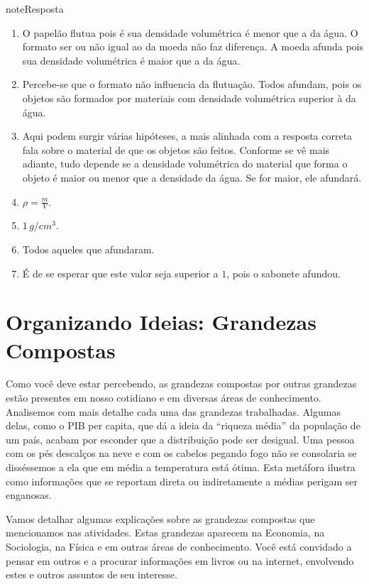 \begin{sphinxadmonition}{note}{Resposta}
\begin{enumerate}
\item {} 
O papelão  flutua pois é sua densidade volumétrica é menor que a da água. O formato ser ou não igual ao da moeda não faz diferença. A moeda afunda pois sua densidade volumétrica é maior que a da água.

\item {} 
Percebe-se que o formato não influencia da flutuação. Todos afundam, pois os objetos são formados por materiais  com densidade volumétrica superior à da água.

\item {} 
Aqui podem surgir várias hipóteses, a mais alinhada com a resposta correta fala sobre o material de que os objetos são feitos. Conforme se vê mais adiante, tudo depende se a densidade volumétrica do material que forma o objeto é maior ou menor que a densidade da água. Se for maior, ele afundará.

\item {} 
\(\rho = \frac{m}{V}\).

\item {} 
\(1 \,g/cm^3\).

\item {} 
Todos aqueles que afundaram.

\item {} 
É de se esperar que este valor seja superior a \(1\), pois o sabonete afundou.

\end{enumerate}
\end{sphinxadmonition}


\section{Organizando Ideias: Grandezas Compostas}
\label{\detokenize{NO103-2:organizando-ideias-grandezas-compostas}}
Como você deve estar percebendo, as grandezas compostas por outras grandezas estão presentes em nosso cotidiano e em diversas áreas de conhecimento. Analisemos com mais detalhe cada uma das grandezas trabalhadas. Algumas delas, como o PIB per capita, que dá a ideia da “riqueza média” da população de um país, acabam por esconder que a distribuição pode ser desigual. Uma pessoa com os pés descalços na neve e com os cabelos pegando fogo não se consolaria se disséssemos a ela que em média a temperatura está ótima. Esta metáfora ilustra como informações que se reportam direta ou indiretamente a médias perigam ser enganosas.

Vamos detalhar algumas explicações sobre as grandezas compostas que mencionamos nas atividades. Estas grandezas aparecem na Economia, na Sociologia, na Física e em outras áreas de conhecimento. Você está convidado a pensar em outros e a procurar informações em livros ou na internet, envolvendo estes e outros assuntos de seu interesse.

